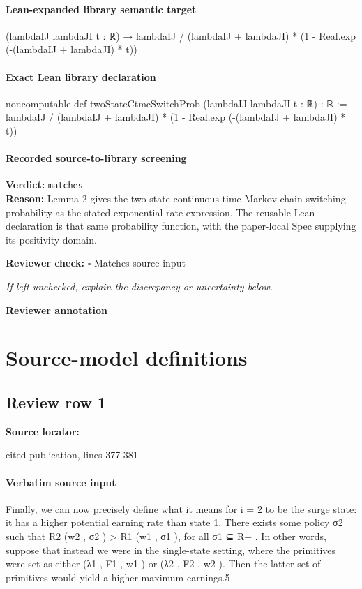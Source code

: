 \documentclass[10pt]{article}
\newcommand{\reviewerbox}{%
  \par\noindent\fbox{\parbox{0.96\linewidth}{\rule{0pt}{0.38in}}}\par
}
\newcommand{\reviewmatch}[1]{%
  \par\noindent\textbf{Reviewer check:} $\square$\; #1\par
  \noindent\emph{If left unchecked, explain the discrepancy or uncertainty below.}\par
}
\begin{document}
\paragraph{Lean-expanded library semantic target}
\begin{ReviewVerbatim}
(lambdaIJ lambdaJI t : ℝ) → lambdaIJ / (lambdaIJ + lambdaJI) * (1 - Real.exp (-(lambdaIJ + lambdaJI) * t))
\end{ReviewVerbatim}

\paragraph{Exact Lean library declaration}
\begin{ReviewVerbatim}
noncomputable def twoStateCtmcSwitchProb (lambdaIJ lambdaJI t : ℝ) : ℝ :=
  lambdaIJ / (lambdaIJ + lambdaJI) *
    (1 - Real.exp (-(lambdaIJ + lambdaJI) * t))
\end{ReviewVerbatim}

\paragraph{Recorded source-to-library screening}
\textbf{Verdict:} \texttt{matches}
\\
\textbf{Reason:} Lemma 2 gives the two-state continuous-time Markov-chain switching probability as the stated exponential-rate expression. The reusable Lean declaration is that same probability function, with the paper-local Spec supplying its positivity domain.
\reviewmatch{Matches source input}
\noindent\textbf{Reviewer annotation}\par
\reviewerbox

\clearpage
\hypertarget{source-claim-8cb807f3cc8978b3}{}
\hypertarget{source-section-18edf361830b9d0b}{}
\section*{Source-model definitions}
\subsection*{Review row 1}
\textbf{Source locator:} {\footnotesize\raggedright cited publication, lines 377-\allowbreak{}381\par}
\paragraph{Verbatim source input}
\begin{ReviewVerbatim}
Finally, we can now precisely define what it means for i = 2 to be the surge state: it has a higher
potential earning rate than state 1. There exists some policy σ2 such that R2 (w2 , σ2 ) > R1 (w1 , σ1 ),
for all σ1 ⊆ R+ . In other words, suppose that instead we were in the single-state setting, where
the primitives were set as either (λ1 , F1 , w1 ) or (λ2 , F2 , w2 ). Then the latter set of primitives would
yield a higher maximum earnings.5
\end{ReviewVerbatim}
\end{document}
